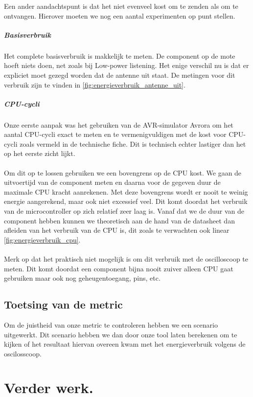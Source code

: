 \documentclass[11pt]{article}
\begin{document}
Een ander aandachtspunt is dat het niet evenveel kost om te zenden als om te
ontvangen. Hierover moeten we nog een aantal experimenten op punt stellen.

\subparagraph{Basisverbruik}

Het complete basisverbruik is makkelijk te meten. De component op de mote hoeft niets doen, net zoals bij Low-power listening. Het enige verschil nu is dat er expliciet moet gezegd worden dat de antenne uit staat.
De metingen voor dit verbruik zijn te vinden in \ref{fig:energieverbruik_antenne_uit}.

\subparagraph{CPU-cycli}

Onze eerste aanpak was het gebruiken van de AVR-simulator Avrora
\cite{titzer2005avrora} om het aantal CPU-cycli exact te meten en te
vermenigvuldigen met de kost voor CPU-cycli zoals vermeld in de technische
fiche. Dit is technisch echter lastiger dan het op het eerste zicht lijkt.
\\
\\
Om dit op te lossen gebruiken we een bovengrens op de CPU kost. We gaan de uitvoertijd van de component meten en daarna voor de gegeven duur de maximale CPU kracht aanrekenen. Met deze bovengrens wordt er nooit te weinig energie aangerekend, maar ook niet excessief veel. Dit komt doordat het verbruik van de microcontroller op zich relatief zeer laag is. Vanaf dat we de duur van de component hebben kunnen we theoretisch aan de hand van de datasheet dan afleiden van het verbruik van de CPU is, dit zoals te verwachten ook linear \ref{fig:energieverbruik_cpu}.\\
\\
Merk op dat het praktisch niet mogelijk is om dit verbruik met de oscilloscoop te meten.
Dit komt doordat een component bijna nooit zuiver alleen CPU gaat gebruiken maar ook nog geheugentoegang, pins, etc. 

\subsection{Toetsing van de metric}

Om de juistheid van onze metric te controleren hebben we een scenario uitgewerkt. Dit scenario hebben we dan door onze tool laten berekenen om te kijken of het resultaat hiervan overeen kwam met het energieverbruik volgens de oscilosscoop.

\section{Verder werk.} 
\end{document}
